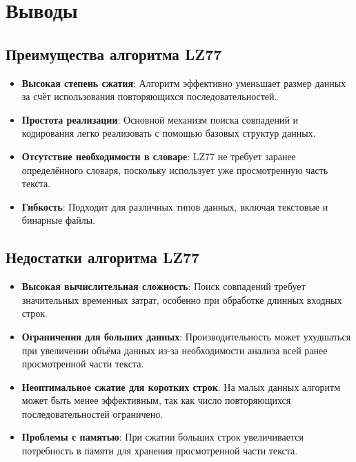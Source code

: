 \section*{Выводы}

\subsection*{Преимущества алгоритма LZ77}
\begin{itemize}
    \item \textbf{Высокая степень сжатия}: Алгоритм эффективно уменьшает размер данных за счёт использования повторяющихся последовательностей.
    \item \textbf{Простота реализации}: Основной механизм поиска совпадений и кодирования легко реализовать с помощью базовых структур данных.
    \item \textbf{Отсутствие необходимости в словаре}: LZ77 не требует заранее определённого словаря, поскольку использует уже просмотренную часть текста.
    \item \textbf{Гибкость}: Подходит для различных типов данных, включая текстовые и бинарные файлы.
\end{itemize}

\subsection*{Недостатки алгоритма LZ77}
\begin{itemize}
    \item \textbf{Высокая вычислительная сложность}: Поиск совпадений требует значительных временных затрат, особенно при обработке длинных входных строк.
    \item \textbf{Ограничения для больших данных}: Производительность может ухудшаться при увеличении объёма данных из-за необходимости анализа всей ранее просмотренной части текста.
    \item \textbf{Неоптимальное сжатие для коротких строк}: На малых данных алгоритм может быть менее эффективным, так как число повторяющихся последовательностей ограничено.
    \item \textbf{Проблемы с памятью}: При сжатии больших строк увеличивается потребность в памяти для хранения просмотренной части текста.
\end{itemize}


